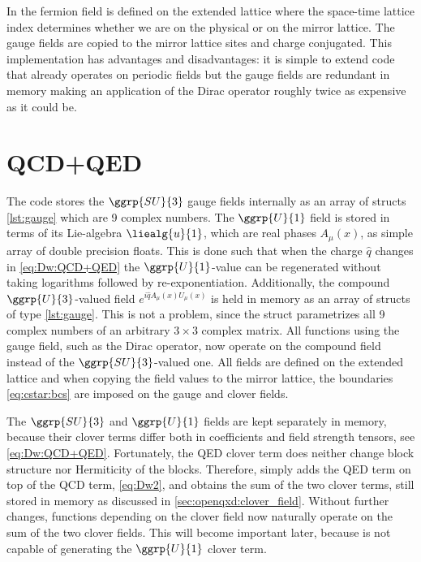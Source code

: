 In \openqxd the fermion field is defined on the extended lattice where the space-time lattice index determines whether we are on the physical or on the mirror lattice.
The gauge fields are copied to the mirror lattice sites and charge conjugated.
This implementation has advantages and disadvantages:
it is simple to extend code that already operates on periodic fields but the gauge fields are redundant in memory making an application of the Dirac operator roughly twice as expensive as it could be. %

\section{QCD+QED}
\label{sec:openqxd:qcd+qed}

The code stores the $\ggrp{SU}{3}$ gauge fields internally as an array of structs \cref{lst:gauge} which are \num{9} complex numbers.
The $\ggrp{U}{1}$ field is stored in terms of its Lie-algebra $\liealg{u}{1}$, which are real phases $A_{\mu}(x)$, as simple array of double precision floats.
This is done such that when the charge $\hat{q}$ changes in \cref{eq:Dw:QCD+QED} the $\ggrp{U}{1}$-value can be regenerated without taking logarithms followed by re-exponentiation.
Additionally, the compound $\ggrp{U}{3}$-valued field $e^{i \hat{q} A_{\mu}(x) U_{\mu}(x)}$ is held in memory as an array of structs of type \cref{lst:gauge}.
This is not a problem, since the  struct parametrizes all \num{9} complex numbers of an arbitrary $3 \times 3$ complex matrix.
All functions using the gauge field, such as the Dirac operator, now operate on the compound field instead of the $\ggrp{SU}{3}$-valued one.
All fields are defined on the extended lattice and when copying the field values to the mirror lattice, the boundaries \cref{eq:cstar:bcs} are imposed on the gauge and clover fields.

The $\ggrp{SU}{3}$ and $\ggrp{U}{1}$ fields are kept separately in memory, because their clover terms differ both in coefficients and field strength tensors, see \cref{eq:Dw:QCD+QED}.
Fortunately, the QED clover term does neither change block structure nor Hermiticity of the blocks.
Therefore, \openqxd simply adds the QED term on top of the QCD term, \cref{eq:Dw2}, and obtains the sum of the two clover terms, still stored in memory as discussed in \cref{sec:openqxd:clover_field}.
Without further changes, functions depending on the clover field now naturally operate on the sum of the two clover fields.
This will become important later, because \quda is not capable of generating the $\ggrp{U}{1}$ clover term.




